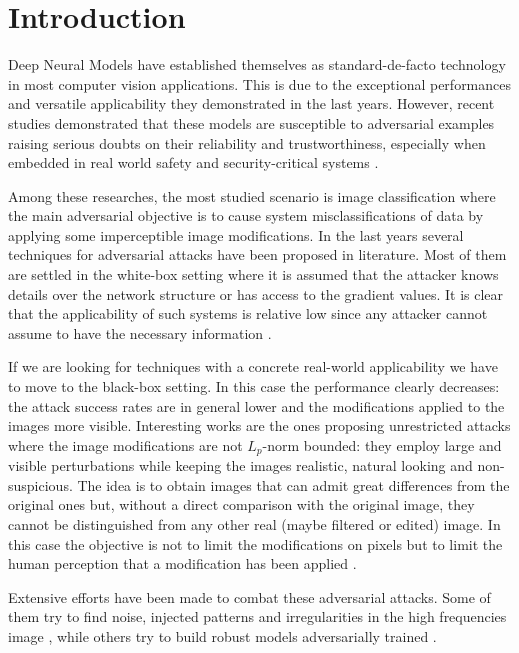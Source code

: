 \chapter{Introduction}
Deep Neural Models have established themselves as standard-de-facto technology in most computer vision applications. This is due to the exceptional performances and versatile applicability they demonstrated in the last years. 
However, recent studies demonstrated that these models are susceptible to adversarial examples raising serious doubts on their reliability and trustworthiness, especially when embedded in real world safety and security-critical systems \cite{Szegedy2014IntriguingPO,Goodfellow2015ExplainingAH,Papernot2016TheLO, kurakin2016adversarial} .

Among these researches, the most studied scenario is image classification where the main adversarial objective is to cause system  misclassifications of data by applying some imperceptible image modifications.
In the last years several techniques for adversarial attacks have been proposed in literature. Most of them are settled in the white-box setting where it is assumed that the attacker knows details over the network structure or has access to the gradient values. It is clear that the applicability of such systems is relative low since any attacker cannot assume to have the necessary information \cite{Goodfellow2015ExplainingAH, madry2017towards, kurakin2016adversarial, carlini2017towards,Papernot2016TheLO}.

If we are looking for techniques with a concrete real-world applicability we have to move to the black-box setting. In this case the performance clearly decreases: the attack success rates are in general lower and the modifications applied to the images more visible. Interesting works are the ones proposing unrestricted attacks where the image modifications are not $L_p$-norm bounded: they employ large and visible perturbations while keeping the images realistic, natural looking and non-suspicious. The idea is to obtain images that can admit great differences from the original ones but, without a direct comparison with the original image, they cannot be distinguished from any other real (maybe filtered or edited) image. In this case the objective is not to limit the modifications on pixels but to limit the human perception that a modification has been applied \cite{Colorfool,ACE,wang2021demiguise}.

Extensive efforts have been made to combat these adversarial attacks. Some of them try to find noise, injected patterns and irregularities in the high frequencies image \cite{moosavi2018divide,liao2018defense}, while others try to build robust models adversarially trained \cite{andriushchenko2020understanding,bai2021recent}. 

